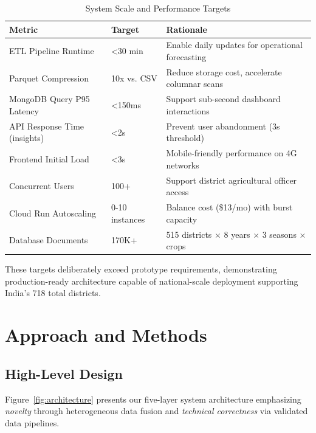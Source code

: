 \documentclass[10pt,a4paper]{article}
\begin{document}
\begin{table}[h]
\centering
\caption{System Scale and Performance Targets}
\small
\begin{tabular}{@{}lll@{}}
\toprule
\textbf{Metric} & \textbf{Target} & \textbf{Rationale} \\
\midrule
ETL Pipeline Runtime & <30 min & Enable daily updates for operational forecasting \\
Parquet Compression & 10x vs. CSV & Reduce storage cost, accelerate columnar scans \\
MongoDB Query P95 Latency & <150ms & Support sub-second dashboard interactions \\
API Response Time (insights) & <2s & Prevent user abandonment (3s threshold) \\
Frontend Initial Load & <3s & Mobile-friendly performance on 4G networks \\
Concurrent Users & 100+ & Support district agricultural officer access \\
Cloud Run Autoscaling & 0-10 instances & Balance cost (\$13/mo) with burst capacity \\
Database Documents & 170K+ & 515 districts × 8 years × 3 seasons × crops \\
\bottomrule
\end{tabular}
\end{table}

These targets deliberately exceed prototype requirements, demonstrating production-ready architecture capable of national-scale deployment supporting India's 718 total districts.

\section{Approach and Methods}

\subsection{High-Level Design}
Figure~\ref{fig:architecture} presents our five-layer system architecture emphasizing \textit{novelty} through heterogeneous data fusion and \textit{technical correctness} via validated data pipelines.
\end{document}
